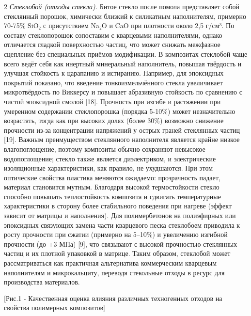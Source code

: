 \begin{multicols}{2}
\emph{Стеклобой (отходы стекла).} Битое стекло после помола представляет
собой стеклянный порошок, химически близкий к силикатным наполнителям,
примерно 70-75\% SiO₂ с присутствием Na₂O и CaO при плотности около 2,5
г/см³. По составу стеклопорошок сопоставим с кварцевыми наполнителями,
однако отличается гладкой поверхностью частиц, что может снижать
межфазное сцепление без специальных приёмов модификации. В композитах
стеклобой чаще всего ведёт себя как инертный минеральный наполнитель,
повышая твёрдость и улучшая стойкость к царапанию и истиранию. Например,
для эпоксидных покрытий показано, что введение тонкоизмельчённого стекла
увеличивает микротвёрдость по Виккерсу и повышает абразивную стойкость
по сравнению с чистой эпоксидной смолой {[}18{]}. Прочность при изгибе и
растяжении при умеренном содержании стеклопорошка (порядка 5-10\%) может
незначительно возрастать, тогда как при высоких долях (более 30\%)
возможно снижение прочности из-за концентрации напряжений у острых
граней стеклянных частиц {[}19{]}. Важным преимуществом стеклянного
наполнителя является крайне низкое влагопоглощение, поэтому композиты
обычно сохраняют невысокое водопоглощение; стекло также является
диэлектриком, и электрические изоляционные характеристики, как правило,
не ухудшаются. При этом оптические свойства пластика меняются ожидаемо:
прозрачность падает, материал становится мутным. Благодаря высокой
термостойкости стекло способно повышать теплостойкость композита и
сдвигать температурные характеристики в сторону более стабильного
поведения при нагреве (эффект зависит от матрицы и наполнения). Для
полимербетонов на полиэфирных или эпоксидных связующих замена части
кварцевого песка стеклобоем приводила к росту прочности при сжатии
(примерно на 5--10\%) и увеличению изгибной прочности (до +3 МПа)
{[}9{]}, что связывают с высокой прочностью стеклянных частиц и их
плотной упаковкой в матрице. Таким образом, стеклобой может
рассматриваться как практичная альтернатива коммерческим кварцевым
наполнителям и микрокальциту, переводя стекольные отходы в ресурс для
производства материалов.

[Рис.1 - Качественная оценка влияния
различных техногенных отходов на свойства полимерных композитов]


\end{multicols}
